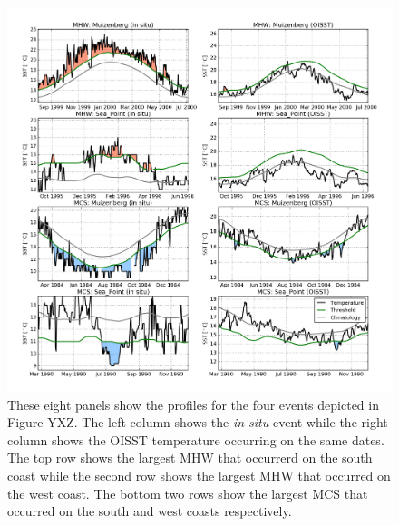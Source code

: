 \documentclass[a4paper,10pt,review]{elsarticle}
\begin{document}
\begin{figure}
\centering \includegraphics[width=1.0\textwidth]{figure4.png}
\caption{These eight panels show the profiles for the four events depicted in Figure YXZ. The left column shows the \emph{in situ} event while the right column shows the OISST temperature occurring on the same dates. The top row shows the largest MHW that occurrerd on the south coast while the second row shows the largest MHW that occurred on the west coast. The bottom two rows show the largest MCS that occurred on the south and west coasts respectively.} \label{fig:Figure4}
\end{figure}
\end{document}
